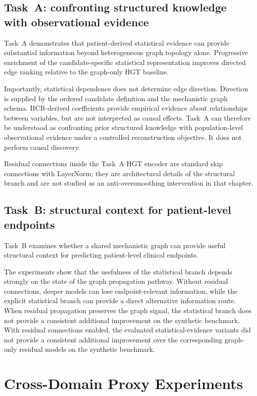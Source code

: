 \subsection*{Task~A: confronting structured knowledge with observational evidence}

Task~A demonstrates that patient-derived statistical evidence can provide substantial
information beyond heterogeneous graph topology alone. Progressive enrichment of the
candidate-specific statistical representation improves directed edge ranking relative to the
graph-only HGT baseline.

Importantly, statistical dependence does not determine edge direction. Direction is supplied
by the ordered candidate definition and the mechanistic graph schema. HCR-derived
coefficients provide empirical evidence about relationships between variables, but are not
interpreted as causal effects.
Task~A can therefore be understood as confronting prior structured knowledge with
population-level observational evidence under a controlled reconstruction objective.
It does not perform causal discovery.

Residual connections inside the Task~A HGT encoder are standard skip connections with
LayerNorm; they are architectural details of the structural branch and are not studied as an
anti-oversmoothing intervention in that chapter.

\subsection*{Task~B: structural context for patient-level endpoints}

Task~B examines whether a shared mechanistic graph can provide useful structural context
for predicting patient-level clinical endpoints.

The experiments show that the usefulness of the statistical branch depends strongly on the
state of the graph propagation pathway. Without residual connections, deeper models can
lose endpoint-relevant information, while the explicit statistical branch can provide a
direct alternative information route. When residual propagation preserves the graph signal,
the statistical branch does not provide a consistent additional improvement on the
synthetic benchmark.
With residual connections enabled, the evaluated statistical-evidence variants did not
provide a consistent additional improvement over the corresponding graph-only residual
models on the synthetic benchmark.

\section{Cross-Domain Proxy Experiments}
\label{sec:joint-proxies}

